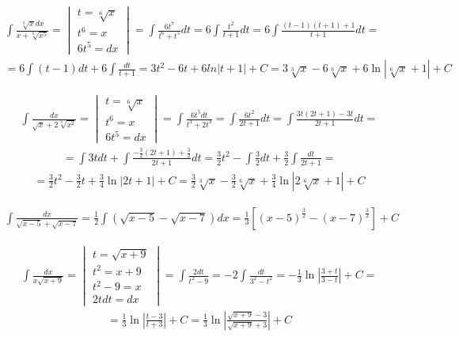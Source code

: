 
\begin{gather*}\int \frac{\sqrt[3]{x}dx}{x+\sqrt[6]{x^5}} = \begin{vmatrix}
t=\sqrt[6]{x} \\
t^6=x \\
6t^5=dx \end{vmatrix} = \int \frac{6t^7}{t^6+t^5}dt = 6\int \frac{t^2}{t+1}dt = 6 \int \frac{(t-1)(t+1)+1}{t+1}dt = \\  = 6\int (t-1)dt + 6\int \frac{dt}{t+1} = 3t^2-6t+6ln|t+1|+C = 3\sqrt[3]{x}-6\sqrt[6]{x}+6\ln|\sqrt[6]{x}+1|+C \end{gather*}



\begin{gather*}\int \frac{dx}{\sqrt{x}+2\sqrt[3]{x^2}} = \begin{vmatrix}
t=\sqrt[6]{x} \\
t^6=x \\
6t^5=dx \end{vmatrix} = \int \frac{6t^5dt}{t^3+2t^4} = \int \frac{6t^2}{2t+1}dt = \int \frac{3t(2t+1)-3t}{2t+1}dt = \end{gather*}
\begin{gather*}= \int 3t dt + \int \frac{-\frac{3}{2}(2t+1)+\frac{3}{2}}{2t+1}dt = \frac{3}{2}t^2 - \int \frac{3}{2}dt + \frac{3}{2}\int \frac{dt}{2t+1} = \end{gather*}
\begin{gather*}= \frac{3}{2}t^2-\frac{3}{2}t+\frac{3}{4}\ln|2t+1|+C = \frac{3}{2}\sqrt[3]{x}-\frac{3}{2}\sqrt[6]{x}+\frac{3}{4}\ln|2\sqrt[6]{x}+1|+C\end{gather*}



\begin{gather*}\int \frac{dx}{\sqrt{x-5}+\sqrt{x-7}} = \frac{1}{2}\int (\sqrt{x-5}-\sqrt{x-7})dx = \frac{1}{3}\left[ (x-5)^{\frac{3}{2}}-(x-7)^{\frac{3}{2}} \right]+C\end{gather*}



\begin{gather*}\int \frac{dx}{x\sqrt{x+9}} = \begin{vmatrix}
t=\sqrt{x+9} \\
t^2=x+9 \\
t^2-9=x \\
2tdt=dx \end{vmatrix} = \int \frac{2dt}{t^2-9} = -2\int \frac{dt}{3^2-t^2} = -\frac{1}{3}\ln\left|\frac{3+t}{3-t}\right|+C = \end{gather*}
\begin{gather*}= \frac{1}{3}\ln\left|\frac{t-3}{t+3}\right|+C = \frac{1}{3}\ln\left|\frac{\sqrt{x+9}-3}{\sqrt{x+9}+3}\right|+C\end{gather*}


